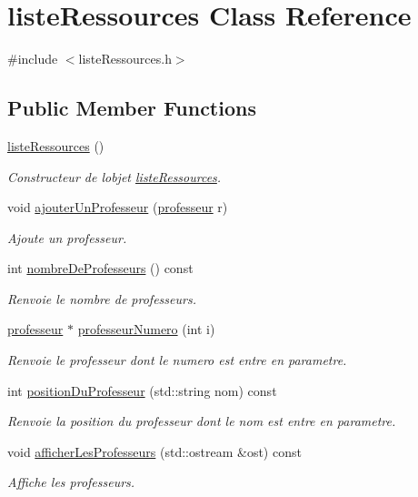 \hypertarget{classliste_ressources}{}\section{liste\+Ressources Class Reference}
\label{classliste_ressources}


{\ttfamily \#include $<$liste\+Ressources.\+h$>$}

\subsection*{Public Member Functions}
\begin{DoxyCompactItemize}
\item 
\hyperlink{classliste_ressources_a3f49a0916898d200295e0e6593253e73}{liste\+Ressources} ()
\begin{DoxyCompactList}\small\item\em Constructeur de l\textquotesingle{}objet \hyperlink{classliste_ressources}{liste\+Ressources}. \end{DoxyCompactList}\item 
void \hyperlink{classliste_ressources_afb8d1bb96971684ed945622b462fcd5d}{ajouter\+Un\+Professeur} (\hyperlink{classprofesseur}{professeur} r)
\begin{DoxyCompactList}\small\item\em Ajoute un professeur. \end{DoxyCompactList}\item 
int \hyperlink{classliste_ressources_a9b496a36a9651347734d7895397dde00}{nombre\+De\+Professeurs} () const
\begin{DoxyCompactList}\small\item\em Renvoie le nombre de professeurs. \end{DoxyCompactList}\item 
\hyperlink{classprofesseur}{professeur} $\ast$ \hyperlink{classliste_ressources_acd47bea2a7105b73adcf0891b82d2e1c}{professeur\+Numero} (int i)
\begin{DoxyCompactList}\small\item\em Renvoie le professeur dont le numero est entre en parametre. \end{DoxyCompactList}\item 
int \hyperlink{classliste_ressources_a1ba16dd4280006301dc94d467b9dddaa}{position\+Du\+Professeur} (std\+::string nom) const
\begin{DoxyCompactList}\small\item\em Renvoie la position du professeur dont le nom est entre en parametre. \end{DoxyCompactList}\item 
void \hyperlink{classliste_ressources_a8459ff3010ad07d1ec5b23d73fad6911}{afficher\+Les\+Professeurs} (std\+::ostream \&ost) const
\begin{DoxyCompactList}\small\item\em Affiche les professeurs. \end{DoxyCompactList}\end{DoxyCompactItemize}
